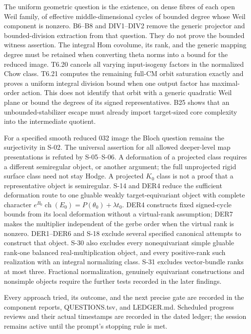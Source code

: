 \documentclass[11pt,a4paper]{article}
\theoremstyle{definition}
\begin{document}
The uniform geometric question is the existence, on dense fibres of each
open Weil family, of effective middle-dimensional cycles of bounded degree
whose Weil component is nonzero. B6--B8 and DIV1--DIV2 remove the generic
projector and bounded-division extraction from that question. They do not
prove the bounded witness assertion. The integral Hom covolume, its rank,
and the generic mapping degree must be retained when converting theta
norms into a bound for the reduced image.
T6.20 cancels all varying input-isogeny factors in the normalized Chow
class. T6.21 computes the remaining full-CM orbit saturation exactly and
proves a uniform integral division bound when one output factor has
maximal-order action. This does not identify that orbit with a generic
quadratic Weil plane or bound the degrees of its signed representatives.
B25 shows that an unbounded-stabilizer escape must already import
target-sized core complexity into the intermediate quotient.

For a specified smooth reduced 032 image the Bloch question remains the
surjectivity in S-02. The universal assertion for all allowed deeper-level
map presentations is refuted by S-05--S-06. A deformation of a projected
class requires a different semiregular object, or another argument; the
full unprojected rigid surface class need not stay Hodge. A projected
$K_0$ class is not a proof that a representative object is semiregular.
S-14 and DER4 reduce the sufficient deformation route to one gluable
weakly target-equivariant object with complete character
$e^{B_0}\operatorname{ch}(E_0)=P(\theta_0)+\lambda t_0$.
DER4 constructs fixed signed-cycle bounds from its local deformation
without a virtual-rank assumption; DER7 makes the multiplier independent
of the gerbe order when the virtual rank is nonzero. DER1--DER6 and
S-18 exclude several specified canonical attempts to construct that object.
S-30 also excludes every nonequivariant simple gluable rank-one balanced
real-multiplication object, and every positive-rank such realization with
an integral normalizing class. S-31 excludes vector-bundle ranks at most
three. Fractional normalization, genuinely equivariant constructions and
nonsimple objects require the further tests recorded in the later findings.

Every approach tried, its outcome, and the next precise gate are recorded
in the component reports, QUESTIONS.tsv, and LEDGER.md. Scheduled progress
reviews and their actual timestamps are recorded in the dated ledger;
the session remains active until the prompt's stopping rule is met.
\end{document}
